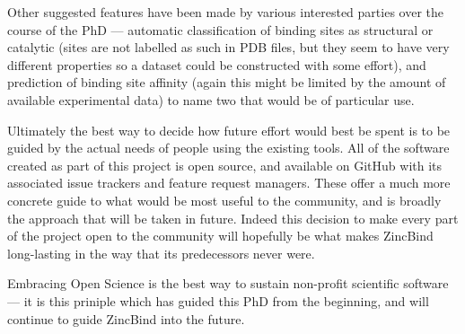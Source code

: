 Other suggested features have been made by various interested parties over the course of the PhD --- automatic classification of binding sites as structural or catalytic (sites are not labelled as such in PDB files, but they seem to have very different properties so a dataset could be constructed with some effort), and prediction of binding site affinity (again this might be limited by the amount of available experimental data) to name two that would be of particular use.

Ultimately the best way to decide how future effort would best be spent is to be guided by the actual needs of people using the existing tools. All of the software created as part of this project is open source, and available on GitHub with its associated issue trackers and feature request managers. These offer a much more concrete guide to what would be most useful to the community, and is broadly the approach that will be taken in future. Indeed this decision to make every part of the project open to the community will hopefully be what makes ZincBind long-lasting in the way that its predecessors never were.

Embracing Open Science is the best way to sustain non-profit scientific software --- it is this priniple which has guided this PhD from the beginning, and will continue to guide ZincBind into the future.

